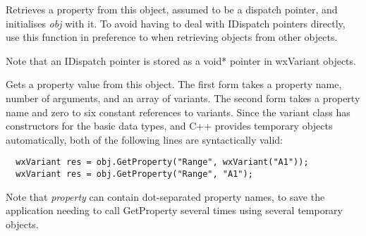 \label{wxautomationobjectgetobject}


Retrieves a property from this object, assumed to be a dispatch pointer, and initialises {\it obj} with it.
To avoid having to deal with IDispatch pointers directly, use this function in preference
to  when retrieving objects
from other objects.

Note that an IDispatch pointer is stored as a void* pointer in wxVariant objects.



\label{wxautomationobjectgetproperty}



Gets a property value from this object. The first form takes a property name, number of
arguments, and an array of variants. The second form takes a property name and zero to six
constant references to variants. Since the variant class has constructors for the basic
data types, and C++ provides temporary objects automatically, both of the following lines
are syntactically valid:

{\small
\begin{verbatim}
  wxVariant res = obj.GetProperty("Range", wxVariant("A1"));
  wxVariant res = obj.GetProperty("Range", "A1");
\end{verbatim}
}

Note that {\it property} can contain dot-separated property names, to save the application
needing to call GetProperty several times using several temporary objects.

\label{wxautomationobjectinvoke}


